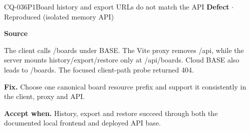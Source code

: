 \begin{finding}{CQ-036}{P1}{Board history and export URLs do not match the API}
\textbf{Defect} $\cdot$ Reproduced (isolated memory API)\par
\textbf{Source}\quad{}\par
The client calls /boards under BASE. The Vite proxy removes /api, while the server mounts history/export/restore only at /api/boards. Cloud BASE also leads to /boards. The focused client-path probe returned 404.\par
\textbf{Fix.} Choose one canonical board resource prefix and support it consistently in the client, proxy and API.\par
\textbf{Accept when.} History, export and restore succeed through both the documented local frontend and deployed API base.
\end{finding}
\clearpage
